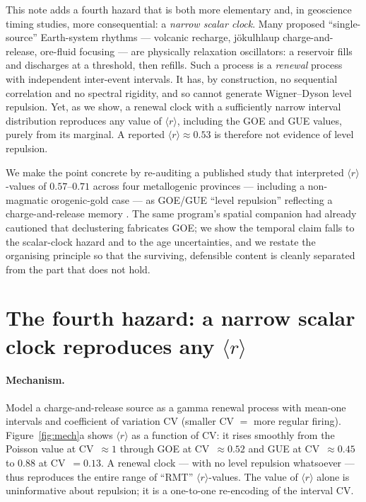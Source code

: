 \documentclass[11pt]{article}
\newcommand{\rr}{\langle r\rangle}
\begin{document}
This note adds a fourth hazard that is both more elementary and, in geoscience
timing studies, more consequential: a \emph{narrow scalar clock}. Many proposed
``single-source'' Earth-system rhythms --- volcanic recharge, jökulhlaup
charge-and-release, ore-fluid focusing --- are physically relaxation oscillators:
a reservoir fills and discharges at a threshold, then refills. Such a process is a
\emph{renewal} process with independent inter-event intervals. It has, by
construction, no sequential correlation and no spectral rigidity, and so cannot
generate Wigner--Dyson level repulsion. Yet, as we show, a renewal clock with a
sufficiently narrow interval distribution reproduces any value of $\rr$, including
the GOE and GUE values, purely from its marginal. A reported $\rr\approx0.53$ is
therefore not evidence of level repulsion.

We make the point concrete by re-auditing a published study that interpreted
$\rr$-values of $0.57$--$0.71$ across four metallogenic provinces --- including a
non-magmatic orogenic-gold case --- as GOE/GUE ``level repulsion'' reflecting a
charge-and-release memory \citep{chen2026metallogeny}. The same program's spatial
companion \citep{chen2026sigma} had already cautioned that declustering fabricates
GOE; we show the temporal claim falls to the scalar-clock hazard and to the age
uncertainties, and we restate the organising principle so that the surviving,
defensible content is cleanly separated from the part that does not hold.

\section{The fourth hazard: a narrow scalar clock reproduces any \texorpdfstring{$\rr$}{r}}

\paragraph{Mechanism.} Model a charge-and-release source as a gamma renewal
process with mean-one intervals and coefficient of variation CV (smaller CV $=$
more regular firing). Figure~\ref{fig:mech}a shows $\rr$ as a function of CV: it
rises smoothly from the Poisson value at CV~$\approx1$ through GOE at
CV~$\approx0.52$ and GUE at CV~$\approx0.45$ to $0.88$ at CV~$=0.13$. A renewal
clock --- with no level repulsion whatsoever --- thus reproduces the entire range
of ``RMT'' $\rr$-values. The value of $\rr$ alone is uninformative about
repulsion; it is a one-to-one re-encoding of the interval CV.
\end{document}
